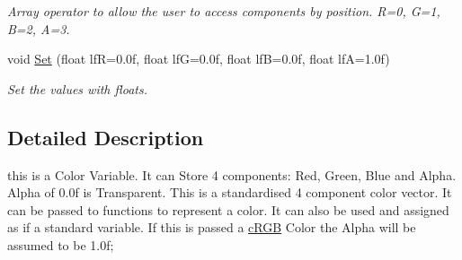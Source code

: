 \begin{DoxyCompactItemize}
\begin{DoxyCompactList}\small\item\em Array operator to allow the user to access components by position. R=0, G=1, B=2, A=3. \end{DoxyCompactList}\item 
\hypertarget{classc_r_g_b_a_a22087ddfe6b9ae99617cbe5090d5439e}{
void \hyperlink{classc_r_g_b_a_a22087ddfe6b9ae99617cbe5090d5439e}{Set} (float lfR=0.0f, float lfG=0.0f, float lfB=0.0f, float lfA=1.0f)}
\label{classc_r_g_b_a_a22087ddfe6b9ae99617cbe5090d5439e}

\begin{DoxyCompactList}\small\item\em Set the values with floats. \end{DoxyCompactList}\end{DoxyCompactItemize}


\subsection{Detailed Description}
this is a Color Variable. It can Store 4 components: Red, Green, Blue and Alpha. Alpha of 0.0f is Transparent. This is a standardised 4 component color vector. It can be passed to functions to represent a color. It can also be used and assigned as if a standard variable. If this is passed a \hyperlink{classc_r_g_b}{cRGB} Color the Alpha will be assumed to be 1.0f; 